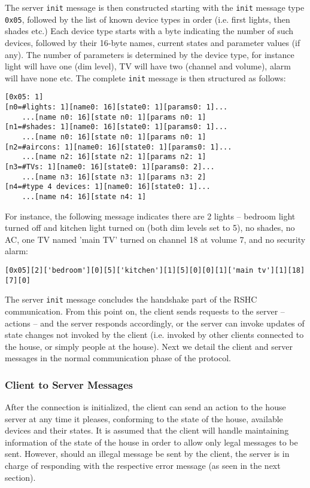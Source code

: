 \noindent
The server {\tt init} message is then constructed starting with the {\tt init} message type {\tt 0x05}, followed by the list of known device types in order (i.e. first lights, then shades etc.) Each device type starts with a byte indicating the number of such devices, followed by their 16-byte names, current states and parameter values (if any). The number of parameters is determined by the device type, for instance light will have one (dim level), TV will have two (channel and volume), alarm will have none etc. The complete {\tt init} message is then structured as follows:

\begin{verbatim}
[0x05: 1]
[n0=#lights: 1][name0: 16][state0: 1][params0: 1]...
    ...[name n0: 16][state n0: 1][params n0: 1]
[n1=#shades: 1][name0: 16][state0: 1][params0: 1]...
    ...[name n0: 16][state n0: 1][params n0: 1]
[n2=#aircons: 1][name0: 16][state0: 1][params0: 1]...
    ...[name n2: 16][state n2: 1][params n2: 1]
[n3=#TVs: 1][name0: 16][state0: 1][params0: 2]...
    ...[name n3: 16][state n3: 1][params n3: 2]
[n4=#type 4 devices: 1][name0: 16][state0: 1]...
    ...[name n4: 16][state n4: 1]
\end{verbatim}

\noindent
For instance, the following message indicates there are 2 lights -- bedroom light turned off and kitchen light turned on (both dim levels set to 5), no shades, no AC, one TV named 'main TV' turned on channel 18 at volume 7, and no security alarm:

\begin{verbatim}
[0x05][2]['bedroom'][0][5]['kitchen'][1][5][0][0][1]['main tv'][1][18][7][0]
\end{verbatim}

\noindent
The server {\tt init} message concludes the handshake part of the RSHC communication. From this point on, the client sends requests to the server -- actions -- and the server responds accordingly, or the server can invoke updates of state changes not invoked by the client (i.e. invoked by other clients connected to the house, or simply people at the house). Next we detail the client and server messages in the normal communication phase of the protocol.


\subsubsection{Client to Server Messages}
\label{sec:pdus:pdu:c_to_s}

After the connection is initialized, the client can send an action to the house server at any time it pleases, conforming to the state of the house, available devices and their states. It is assumed that the client will handle maintaining information of the state of the house in order to allow only legal messages to be sent. However, should an illegal message be sent by the client, the server is in charge of responding with the respective error message (as seen in the next section).

